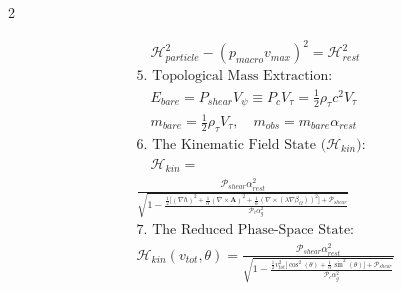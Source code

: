 \begin{multicols}{2}
\begin{tcolorbox}
\begin{align}
    &\quad \mathcal{H}_{particle}^2 - (p_{macro} v_{max})^2 = \mathcal{H}_{rest}^2 \label{eq:dispersion_relation} \\
    &\text{5. Topological Mass Extraction:} \nonumber \\
    &\quad E_{bare} = P_{shear} V_{\psi} \equiv P_c V_{\tau} = \frac{1}{2}\rho_\tau c^2 V_{\tau} \label{eq:rest_energy_integral} \\
    &\quad m_{bare} = \frac{1}{2}\rho_\tau V_{\tau}, \quad m_{obs} = m_{bare} \alpha_{rest} \label{eq:topological_mass} \\
    &\text{6. The Kinematic Field State ($\mathcal{H}_{kin}$):} \nonumber \\
    &\quad \mathcal{H}_{kin} = \nonumber \\ &\frac{\mathcal{P}_{shear} \alpha_{rest}^2}{\sqrt{1 - \frac{\frac{1}{2} \Big[ (\nabla h)^2 + \frac{1}{\alpha}(\nabla \times \mathbf{A})^2 + \frac{1}{\alpha}(\nabla \times (\lambda \nabla \beta_\Omega))^2 \Big] + \mathcal{P}_{shear}}{\mathcal{P}_c \alpha_g^2}}} \label{eq:kinematic_hamiltonian} \\
    &\text{7. The Reduced Phase-Space State:} \nonumber \\
    &\mathcal{H}_{kin}(v_{tot}, \theta) = \frac{\mathcal{P}_{shear} \alpha_{rest}^2}{\sqrt{1 - \frac{\frac{1}{2} v_{tot}^2 \Big[ \cos^2(\theta) + \frac{1}{\alpha}\sin^2(\theta) \Big] + \mathcal{P}_{shear}}{\mathcal{P}_c \alpha_g^2}}} \label{eq:angular_hamiltonian}
\end{align}
\end{tcolorbox}


\end{multicols}
